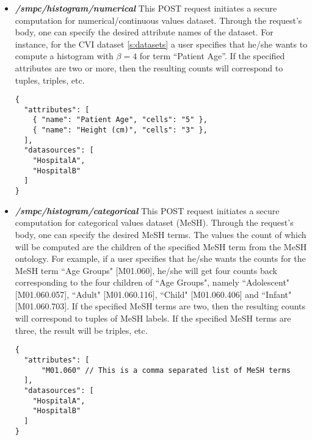 \begin{itemize}
\item \textbf{\textit{/smpc/histogram/numerical}}
This POST request initiates a secure computation for numerical/continuous values dataset.
Through the request's body, one can specify the desired attribute names of the dataset.
For instance, for the CVI dataset \ref{s:datasets} a user specifies that he/she wants to compute a histogram with $\beta = 4$ for term ``Patient Age''.
If the specified attributes are two or more, then the resulting counts will correspond to tuples, triples, etc.

{
\begin{verbatim}
{
  "attributes": [
    { "name": "Patient Age", "cells": "5" },
    { "name": "Height (cm)", "cells": "3" },
  ],
  "datasources": [
    "HospitalA",
    "HospitalB"
  ]
}
\end{verbatim}
\label{sc:histogram-numerical-post}
}



\item \textbf{\textit{/smpc/histogram/categorical}}
This POST request initiates a secure computation for categorical values dataset (MeSH).
Through the request's body, one can specify the desired MeSH terms.
The values the count of which will be computed are the children of the specified MeSH term from the MeSH ontology.
For example, if a user specifies that he/she wants the counts for the MeSH term ``Age Groups" [M01.060], he/she will get four counts back corresponding to the four children of ``Age Groups", namely ``Adolescent" [M01.060.057], ``Adult" [M01.060.116], ``Child" [M01.060.406] and ``Infant" [M01.060.703].
If the specified MeSH terms are two, then the resulting counts will correspond to tuples of MeSH labels.
If the specified MeSH terms are three, the result will be triples, etc.

{
\begin{verbatim}
{
  "attributes": [
      "M01.060" // This is a comma separated list of MeSH terms
  ],
  "datasources": [
    "HospitalA",
    "HospitalB"
  ]
}
\end{verbatim}
\label{sc:histogram-categorical-post}
}




\end{itemize}
